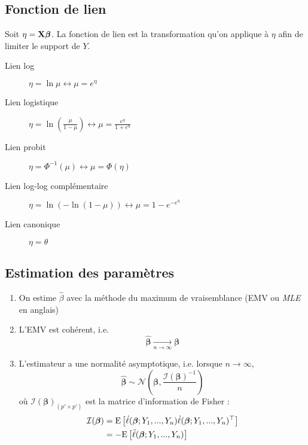 \documentclass[10pt, french]{article}
\begin{document}
\begin{multicols*}{3}
\subsection*{Fonction de lien}
Soit $\eta = \mathbf{X} \boldsymbol{\beta}$. La fonction de lien est la transformation qu'on applique à $\eta$ afin de limiter le support de $Y$.
\begin{description}
\item[Lien log] $\eta = \ln \mu \leftrightarrow \mu = e^{\eta}$
\item[Lien logistique] $\eta = \ln \left( \frac{\mu}{1 - \mu} \right) \leftrightarrow \mu = \frac{e^{\eta}}{1 + e^{\eta}}$

\item[Lien probit] $\eta = \Phi^{-1}(\mu) \leftrightarrow \mu = \Phi(\eta)$

\item[Lien log-log complémentaire] $\eta = \ln ( - \ln (1 - \mu)) \leftrightarrow \mu = 1 - e^{-e^{\eta}}$

\item[Lien canonique] $\eta = \theta$ 
\end{description}

\subsection*{Estimation des paramètres}
\begin{enumerate}[label=\faAngleRight]
\item On estime $\hat{\beta}$ avec la méthode du maximum de vraisemblance (EMV ou \emph{MLE} en anglais)

\item L'EMV est cohérent, i.e.
\[\hat{\bm{\beta}} \underset{n \to \infty}{\longrightarrow} \bm{\beta} \]

\item L'estimateur a une normalité asymptotique, i.e. lorsque $n \to \infty$,
\[  \hat{\bm{\beta}} \sim \mathcal{N} \left( \bm{\beta}, \frac{\mathcal{I}(\bm{\beta})^{-1}}{n} \right)    \]
où $\mathcal{I}(\bm{\beta})_{(p' \times p')}$ est la matrice d'information de Fisher : 
\begin{align*}
\mathcal{I}(\bm{\beta}) & = \mathrm{E} \left[ \dot{\ell}(\bm{\beta} ; Y_1, ..., Y_n) \dot{\ell}(\bm{\beta} ; Y_1, ..., Y_n)^{\top}  \right] \\
	& = - \mathrm{E} \left[ \ddot{\ell}(\bm{\beta} ; Y_1, ..., Y_n) \right] \\
\end{align*}


\end{enumerate}
\end{multicols*}
\end{document}
